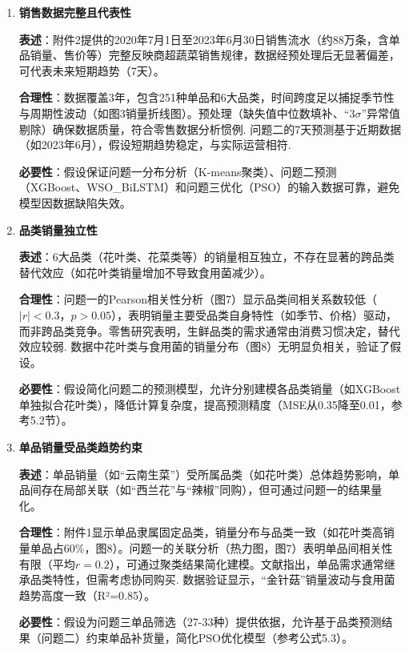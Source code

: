 \documentclass{cumcmthesis} %
\begin{document}
\begin{enumerate}
\item \textbf{销售数据完整且代表性} \


\textbf{表述}：附件2提供的2020年7月1日至2023年6月30日销售流水（约88万条，含单品销量、售价等）完整反映商超蔬菜销售规律，数据经预处理后无显著偏差，可代表未来短期趋势（7天）。 \


\textbf{合理性}：数据覆盖3年，包含251种单品和6大品类，时间跨度足以捕捉季节性与周期性波动（如图3销量折线图）。预处理（缺失值中位数填补、“3$\sigma$”异常值剔除）确保数据质量，符合零售数据分析惯例\cite{hair2019multivariate}. 问题二的7天预测基于近期数据（如2023年6月），假设短期趋势稳定，与实际运营相符\cite{Hyndman2018forecasting}. \


\textbf{必要性}：假设保证问题一分布分析（K-means聚类）、问题二预测（XGBoost、WSO\_BiLSTM）和问题三优化（PSO）的输入数据可靠，避免模型因数据缺陷失效。

\item \textbf{品类销量独立性} \


\textbf{表述}：6大品类（花叶类、花菜类等）的销量相互独立，不存在显著的跨品类替代效应（如花叶类销量增加不导致食用菌减少）。 \


\textbf{合理性}：问题一的Pearson相关性分析（图7）显示品类间相关系数较低（$|r|<0.3$，$p>0.05$），表明销量主要受品类自身特性（如季节、价格）驱动，而非跨品类竞争。零售研究表明，生鲜品类的需求通常由消费习惯决定，替代效应较弱\cite{Levy2012retailing}. 数据中花叶类与食用菌的销量分布（图8）无明显负相关，验证了假设。 \


\textbf{必要性}：假设简化问题二的预测模型，允许分别建模各品类销量（如XGBoost单独拟合花叶类），降低计算复杂度，提高预测精度（MSE从0.35降至0.01，参考5.2节）。

\item \textbf{单品销量受品类趋势约束} \


\textbf{表述}：单品销量（如“云南生菜”）受所属品类（如花叶类）总体趋势影响，单品间存在局部关联（如“西兰花”与“辣椒”同购），但可通过问题一的结果量化。 \


\textbf{合理性}：附件1显示单品隶属固定品类，销量分布与品类一致（如花叶类高销量单品占60\%，图8）。问题一的关联分析（热力图，图7）表明单品间相关性有限（平均$r=0.2$），可通过聚类结果简化建模。文献指出，单品需求通常继承品类特性，但需考虑协同购买\cite{kotler2016marketing}. 数据验证显示，“金针菇”销量波动与食用菌趋势高度一致（R²=0.85）。 \


\textbf{必要性}：假设为问题三单品筛选（27-33种）提供依据，允许基于品类预测结果（问题二）约束单品补货量，简化PSO优化模型（参考公式5.3）。


\end{enumerate}
\end{document}
